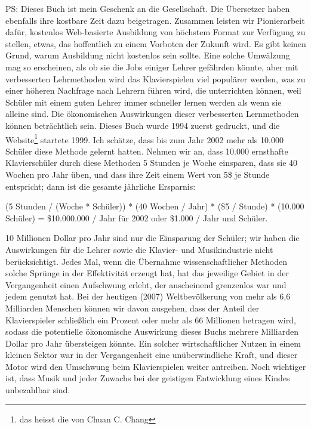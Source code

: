 PS: Dieses Buch ist mein Geschenk an die Gesellschaft.
Die Übersetzer haben ebenfalls ihre kostbare Zeit dazu beigetragen.
Zusammen leisten wir Pionierarbeit dafür, kostenlos Web-basierte Ausbildung von höchstem Format zur Verfügung zu stellen, etwas, das hoffentlich zu einem Vorboten der Zukunft wird.
Es gibt keinen Grund, warum Ausbildung nicht kostenlos sein sollte.
Eine solche Umwälzung mag so erscheinen, als ob sie die Jobs einiger Lehrer gefährden könnte, aber mit verbesserten Lehrmethoden wird das Klavierspielen viel populärer werden, was zu einer höheren Nachfrage nach Lehrern führen wird, die unterrichten können, weil Schüler mit einem guten Lehrer immer schneller lernen werden als wenn sie alleine sind.
Die ökonomischen Auswirkungen dieser verbesserten Lernmethoden können beträchtlich sein.
Dieses Buch wurde 1994 zuerst gedruckt, und die Website\footnote{das heisst die von Chuan C. Chang} startete 1999.
Ich schätze, dass bis zum Jahr 2002 mehr als 10.000 Schüler diese Methode gelernt hatten.
Nehmen wir an, dass 10.000 ernsthafte Klavierschüler durch diese Methoden 5 Stunden je Woche einsparen, dass sie 40 Wochen pro Jahr üben, und dass ihre Zeit einem Wert von 5\$ je Stunde entspricht; dann ist die gesamte jährliche Ersparnis:

(5 Stunden / (Woche * Schüler)) * (40 Wochen / Jahr) * (\$5 / Stunde) * (10.000 Schüler) = \$10.000.000 / Jahr für 2002 oder \$1.000 / Jahr und Schüler.

10 Millionen Dollar pro Jahr sind nur die Einsparung der Schüler; wir haben die Auswirkungen für die Lehrer sowie die Klavier- und Musikindustrie nicht berücksichtigt.
Jedes Mal, wenn die Übernahme wissenschaftlicher Methoden solche Sprünge in der Effektivität erzeugt hat, hat das jeweilige Gebiet in der Vergangenheit einen Aufschwung erlebt, der anscheinend grenzenlos war und jedem genutzt hat.
Bei der heutigen (2007) Weltbevölkerung von mehr als 6,6 Milliarden Menschen können wir davon ausgehen, dass der Anteil der Klavierspieler schließlich ein Prozent oder mehr als 66 Millionen betragen wird, sodass die potentielle ökonomische Auswirkung dieses Buchs mehrere Milliarden Dollar pro Jahr übersteigen könnte.
Ein solcher wirtschaftlicher Nutzen in einem kleinen Sektor war in der Vergangenheit eine unüberwindliche Kraft, und dieser Motor wird den Umschwung beim Klavierspielen weiter antreiben.
Noch wichtiger ist, dass Musik und jeder Zuwachs bei der geistigen Entwicklung eines Kindes unbezahlbar sind.
 



